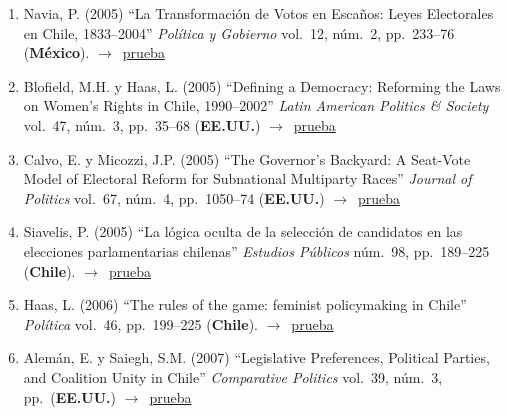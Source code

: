 \documentclass[12 pt, letter]{article}
\newenvironment{CitasMiTrabajo}{
    \begin{footnotesize}
    \begin{enumerate}[label={\footnotesize\emph{cita~\arabic*}},ref=\arabic*] %
        \setlength{\itemsep}{.1\itemsep}
        \setlength{\parskip}{.1\parskip}
    }{\end{enumerate}\end{footnotesize}}
\begin{document}
\begin{CitasMiTrabajo}
        \item Navia, P. (2005)
        ``La Transformaci\'on de Votos en Esca\~nos: Leyes Electorales en Chile, 1833--2004''
        \emph{Pol\'itica y Gobierno} vol.\ 12, n\'um.\ 2, pp.\ 233--76  (\textbf{M\'exico}). $\rightarrow$~\href{http://ericmagar.com/cv/cites/mrs/navia2005pyg.pdf}{prueba}


        \item Blofield, M.H. y Haas, L. (2005)
        ``Defining a Democracy: Reforming the Laws on Women's Rights in Chile, 1990--2002'' \emph{Latin American
        Politics \& Society} vol.\ 47, n\'um.\ 3, pp.\ 35--68  (\textbf{EE.UU.}) $\rightarrow$~\href{http://ericmagar.com/cv/cites/mrs/blofieldHaas.pdf}{prueba}

        \item Calvo, E. y Micozzi, J.P. (2005)
        ``The Governor's Backyard: A
        Seat-Vote Model of Electoral Reform for Subnational Multiparty Races''
        \emph{Journal of Politics} vol.\ 67, n\'um.\ 4, pp.\ 1050--74 (\textbf{EE.UU.}) $\rightarrow$~\href{http://ericmagar.com/cv/cites/mrs/calvoMicozzi.pdf}{prueba}

        \item Siavelis, P. (2005)
        ``La l\'ogica oculta de la selecci\'on de candidatos en las elecciones parlamentarias chilenas''
            \emph{Estudios P\'ublicos}
        n\'um.\ 98, pp.\ 189--225 (\textbf{Chile}). $\rightarrow$~\href{http://ericmagar.com/cv/cites/mrs/Siavelis2005logicaoculta.pdf}{prueba}

        \item Haas, L. (2006)
        ``The rules of the game: feminist policymaking in Chile''
        \emph{Pol\'itica}
        vol.\ 46,
        pp.\ 199--225   (\textbf{Chile}). $\rightarrow$~\href{http://ericmagar.com/cv/cites/mrs/haas2006politica.pdf}{prueba}

        \item Alem\'an, E. y Saiegh, S.M. (2007)
        ``Legislative Preferences,
        Political Parties, and Coalition Unity in Chile'' \emph{Comparative
        Politics} vol.\ 39, n\'um.\ 3, pp.\ (\textbf{EE.UU.}) $\rightarrow$~\href{http://ericmagar.com/cv/cites/mrs/alemanSaiegh07.pdf}{prueba}


\end{CitasMiTrabajo}
\end{document}
